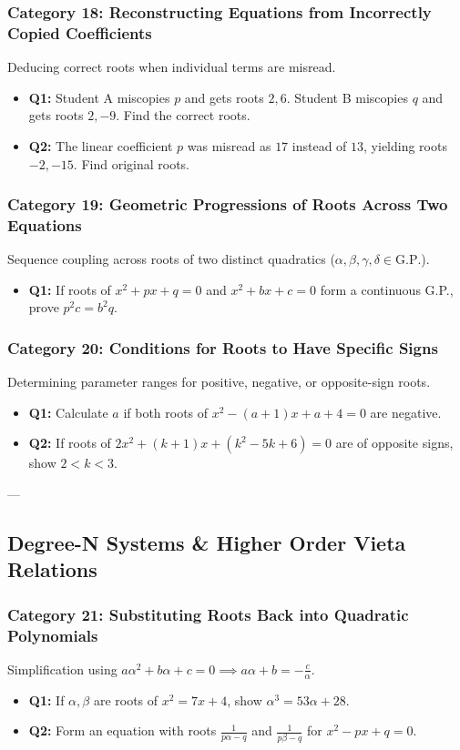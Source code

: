 \documentclass[10pt,a4paper]{article}
\begin{document}
\subsubsection{Category 18: Reconstructing Equations from Incorrectly Copied Coefficients}
Deducing correct roots when individual terms are misread.
\begin{itemize}[leftmargin=*]
    \item \textbf{Q1:} Student A miscopies $p$ and gets roots $2, 6$. Student B miscopies $q$ and gets roots $2, -9$. Find the correct roots.
    \item \textbf{Q2:} The linear coefficient $p$ was misread as $17$ instead of $13$, yielding roots $-2, -15$. Find original roots.
\end{itemize}

\subsubsection{Category 19: Geometric Progressions of Roots Across Two Equations}
Sequence coupling across roots of two distinct quadratics ($\alpha, \beta, \gamma, \delta \in \text{G.P.}$).
\begin{itemize}[leftmargin=*]
    \item \textbf{Q1:} If roots of $x^2 + px + q = 0$ and $x^2 + bx + c = 0$ form a continuous G.P., prove $p^2 c = b^2 q$.
\end{itemize}

\subsubsection{Category 20: Conditions for Roots to Have Specific Signs}
Determining parameter ranges for positive, negative, or opposite-sign roots.
\begin{itemize}[leftmargin=*]
    \item \textbf{Q1:} Calculate $a$ if both roots of $x^2 - (a+1)x + a + 4 = 0$ are negative.
    \item \textbf{Q2:} If roots of $2x^2 + (k+1)x + (k^2-5k+6) = 0$ are of opposite signs, show $2 < k < 3$.
\end{itemize}

---

\subsection{Degree-N Systems \& Higher Order Vieta Relations}

\subsubsection{Category 21: Substituting Roots Back into Quadratic Polynomials}
Simplification using $a\alpha^2 + b\alpha + c = 0 \implies a\alpha + b = -\frac{c}{\alpha}$.
\begin{itemize}[leftmargin=*]
    \item \textbf{Q1:} If $\alpha, \beta$ are roots of $x^2 = 7x + 4$, show $\alpha^3 = 53\alpha + 28$.
    \item \textbf{Q2:} Form an equation with roots $\frac{1}{p\alpha - q}$ and $\frac{1}{p\beta - q}$ for $x^2 - px + q = 0$.
\end{itemize}
\end{document}
